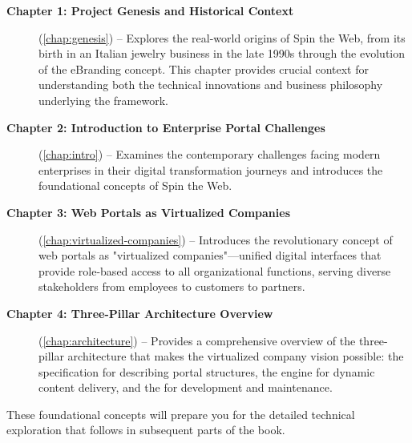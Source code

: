 \begin{description}
\item[\textbf{Chapter 1: Project Genesis and Historical Context}] (\cref{chap:genesis}) -- Explores the real-world origins of Spin the Web, from its birth in an Italian jewelry business in the late 1990s through the evolution of the eBranding concept. This chapter provides crucial context for understanding both the technical innovations and business philosophy underlying the framework.

\item[\textbf{Chapter 2: Introduction to Enterprise Portal Challenges}] (\cref{chap:intro}) -- Examines the contemporary challenges facing modern enterprises in their digital transformation journeys and introduces the foundational concepts of Spin the Web.

\item[\textbf{Chapter 3: Web Portals as Virtualized Companies}] (\cref{chap:virtualized-companies}) -- Introduces the revolutionary concept of web portals as "virtualized companies"—unified digital interfaces that provide role-based access to all organizational functions, serving diverse stakeholders from employees to customers to partners.

\item[\textbf{Chapter 4: Three-Pillar Architecture Overview}] (\cref{chap:architecture}) -- Provides a comprehensive overview of the three-pillar architecture that makes the virtualized company vision possible: the \wbdl{} specification for describing portal structures, the \webspinner{} engine for dynamic content delivery, and the \studio{} for development and maintenance.
\end{description}

These foundational concepts will prepare you for the detailed technical exploration that follows in subsequent parts of the book.
